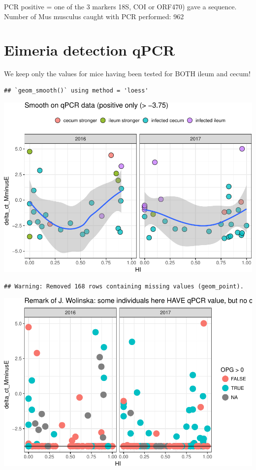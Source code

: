 \documentclass[]{article}
\begin{document}
PCR positive = one of the 3 markers 18S, COI or ORF470) gave a sequence.
Number of Mus musculus caught with PCR performed: 962

\section{Eimeria detection qPCR}\label{eimeria-detection-qpcr-1}

We keep only the values for mice having been tested for BOTH ileum and
cecum!

\begin{verbatim}
## `geom_smooth()` using method = 'loess'
\end{verbatim}

\includegraphics{Data_Analysis_Alice_files/figure-latex/qpcr_3.75-1.pdf}

\begin{verbatim}
## Warning: Removed 168 rows containing missing values (geom_point).
\end{verbatim}

\includegraphics{Data_Analysis_Alice_files/figure-latex/qpcr_3.75-2.pdf}
\end{document}
